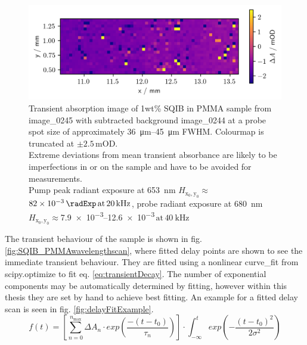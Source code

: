 \documentclass[twoside,openright,listof=numbered]{scrreprt}
\def\pumpExp#1{\ensuremath{\SI{#1}{\radExp}\,\mathrm{at}\, \SI{20}{\kilo\hertz}}}
\def\frep#1{\ensuremath{\,\mathrm{at}\, \SI{#1}{\kilo\hertz}}}
\def\radiantExp{\ensuremath{H_\mathrm{x_0,y_0}}}
\begin{document}
\begin{figure}[hbt]
\centering
\includegraphics[scale=1]{images/1percentSQIBinPMMA_Sample653-680Image.png}
\caption[Transient absorption image of 1wt\% SQIB in PMMA sample from image\_0245 with subtracted background image\_0244 for pump \qty{653}{\nano\meter} and probe \qty{680}{\nano\meter}.]{Transient absorption image of 1wt\% SQIB in PMMA sample from image\_0245 with subtracted background image\_0244 at a probe spot size of approximately \SIrange{36}{45}{\micro\meter} FWHM. Colourmap is truncated at $\pm2.5\,\text{mOD}$.\\ Extreme deviations from mean transient absorbance are likely to be imperfections in or on the sample and have to be avoided for measurements.\\ Pump peak radiant exposure at \SI{653}{\nano\meter} $\radiantExp\approx$ \pumpExp{82e-3}, probe radiant exposure at \SI{680}{\nano\meter} $\radiantExp\approx$\SIrange{7.9e-3}{12.6e-3}{\radExp}\frep{40} \label{fig:TA_image_sample}}
\end{figure}

The transient behaviour of the sample is shown in fig. \ref{fig:SQIB_PMMAwavelengthscan}, where fitted delay points are shown to see the immediate transient behaviour. They are fitted using a nonlinear curve\_fit from scipy.optimize to fit eq. \ref{eq:transientDecay}. The number of exponential components may be automatically determined by fitting, however within this thesis they are set by hand to achieve best fitting. An example for a fitted delay scan is seen in fig. \ref{fig:delayFitExample}.
\begin{equation}\label{eq:transientDecay}
f(t) = \left[\sum_{n=0}^{n_\text{max}} \Delta A_n\cdot exp \left(\frac{-(t-t_0)}{\tau_n}\right)\right]\cdot \int_{-\infty}^t exp\left(-\frac{(t-t_0)^2}{2\sigma^2}\right)
\end{equation}
\end{document}
